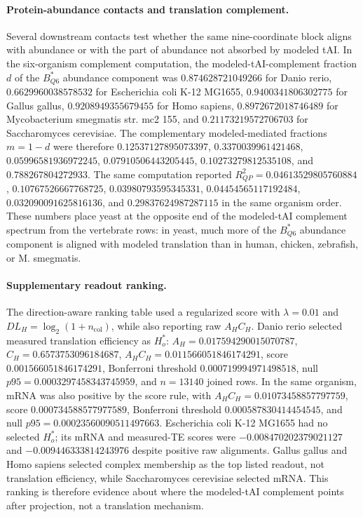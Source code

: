 \paragraph{Protein-abundance contacts and translation complement.}
Several downstream contacts test whether the same nine-coordinate block aligns with abundance or with the part of abundance not absorbed by modeled tAI. In the six-organism complement computation, the modeled-tAI-complement fraction $d$ of the $B^{*}_{Q6}$ abundance component was $0.874628721049266$ for Danio rerio, $0.6629960038578532$ for Escherichia coli K-12 MG1655, $0.9400341806302775$ for Gallus gallus, $0.9208949355679455$ for Homo sapiens, $0.8972672018746489$ for Mycobacterium smegmatis str. mc2 155, and $0.21173219572706703$ for Saccharomyces cerevisiae. The complementary modeled-mediated fractions $m=1-d$ were therefore $0.12537127895073397$, $0.3370039961421468$, $0.05996581936972245$, $0.07910506443205445$, $0.10273279812535108$, and $0.788267804272933$. The same computation reported $R^2_{QP}=0.04613529805760884$, $0.10767526667768725$, $0.03980793595345331$, $0.04454565117192484$, $0.032090091625816136$, and $0.29837624987287115$ in the same organism order. These numbers place yeast at the opposite end of the modeled-tAI complement spectrum from the vertebrate rows: in yeast, much more of the $B^{*}_{Q6}$ abundance component is aligned with modeled translation than in human, chicken, zebrafish, or M. smegmatis.

\paragraph{Supplementary readout ranking.}
The direction-aware ranking table used a regularized score with $\lambda=0.01$ and $DL_H=\log_2(1+n_{\mathrm{col}})$, while also reporting raw $A_H C_H$. Danio rerio selected measured translation efficiency as $H_o^*$: $A_H=0.017594290015070787$, $C_H=0.6573753096184687$, $A_HC_H=0.011566051846174291$, score $0.001566051846174291$, Bonferroni threshold $0.000719994971498518$, null $p95=0.0003297458343745959$, and $n=13140$ joined rows. In the same organism, mRNA was also positive by the score rule, with $A_HC_H=0.01073458857797759$, score $0.000734588577977589$, Bonferroni threshold $0.000587830414454545$, and null $p95=0.00023560090511497663$. Escherichia coli K-12 MG1655 had no selected $H_o^*$; its mRNA and measured-TE scores were $-0.008470202379021127$ and $-0.009446333814243976$ despite positive raw alignments. Gallus gallus and Homo sapiens selected complex membership as the top listed readout, not translation efficiency, while Saccharomyces cerevisiae selected mRNA. This ranking is therefore evidence about where the modeled-tAI complement points after projection, not a translation mechanism.

